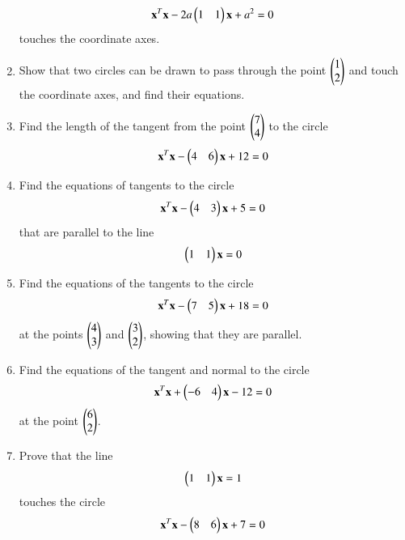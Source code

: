 \begin{enumerate}[label=\arabic*.,ref=\thesubsection.\theenumi]
\begin{align}
\mathbf{x}^T\mathbf{x}-2a\begin{pmatrix}1 & 1\end{pmatrix}\mathbf{x}+a^2 = 0
\label{eq:solutions/4/2/5/eq1}
\end{align}
touches the coordinate axes.
\solution

\item Show that two circles can be drawn to pass through the point $\begin{pmatrix}1\\2\end{pmatrix}$ and touch the coordinate axes, and find their equations.
\solution

\item Find the length of the tangent from the point $\begin{pmatrix}7\\4\end{pmatrix}$ to the circle
\begin{align}
		 \mathbf{x}^T\mathbf{x}- \begin{pmatrix}4 & 6\end{pmatrix}\mathbf{x}+12=0\label{eq:solutions/4/2/7/eq:1}
\end{align}
\solution

\item  Find the equations of tangents to the circle 
\begin{align}
\mathbf{x}^T\mathbf{x}-\begin{pmatrix}4 & 3\end{pmatrix}\mathbf{x}+5 = 0 \label{eq:solutions/4/2/8/given_circle_eq}
\end{align}
that are parallel to the line
\begin{align}
\begin{pmatrix}1 &1\end{pmatrix}\mathbf{x}=0 \label{eq:solutions/4/2/8/given_line_eq}
\end{align}
%
\solution

\renewcommand{\theequation}{\theenumi}
\item Find the equations of the tangents to the circle
\begin{align}
\mathbf{x}^T\mathbf{x}-\begin{pmatrix}7 & 5\end{pmatrix}\mathbf{x}+18 = 0
\end{align}
at the points $\begin{pmatrix}4\\3\end{pmatrix}$ and $\begin{pmatrix}3\\2\end{pmatrix}$, showing that they are parallel.
\item Find the equations of the tangent and normal to the circle
\begin{align}
\mathbf{x}^T\mathbf{x}+\begin{pmatrix}-6 & 4\end{pmatrix}\mathbf{x}-12 = 0
\end{align}
at the point $\begin{pmatrix}6\\2\end{pmatrix}$.
\item Prove that the line 
\begin{align}
\begin{pmatrix}1 & 1\end{pmatrix}\mathbf{x} = 1
\end{align}
touches the circle
\begin{align}
\vec{x}^T\vec{x}-\myvec{8 & 6}\vec{x}+7 = 0

\end{align}
\end{enumerate}
